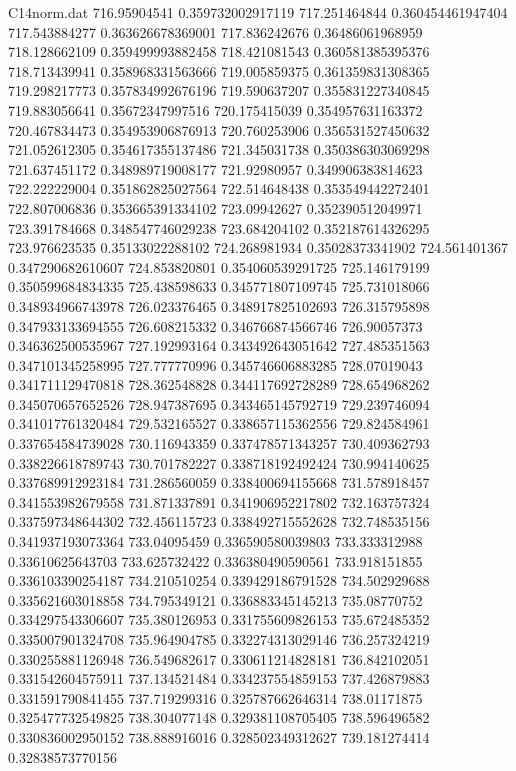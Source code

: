 \begin{filecontents}{C14norm.dat}
716.95904541			0.359732002917119
717.251464844			0.360454461947404
717.543884277			0.363626678369001
717.836242676			0.36486061968959
718.128662109			0.359499993882458
718.421081543			0.360581385395376
718.713439941			0.358968331563666
719.005859375			0.361359831308365
719.298217773			0.357834992676196
719.590637207			0.355831227340845
719.883056641			0.35672347997516
720.175415039			0.354957631163372
720.467834473			0.354953906876913
720.760253906			0.356531527450632
721.052612305			0.354617355137486
721.345031738			0.350386303069298
721.637451172			0.348989719008177
721.92980957			0.349906383814623
722.222229004			0.351862825027564
722.514648438			0.353549442272401
722.807006836			0.353665391334102
723.09942627			0.352390512049971
723.391784668			0.348547746029238
723.684204102			0.352187614326295
723.976623535			0.35133022288102
724.268981934			0.35028373341902
724.561401367			0.347290682610607
724.853820801			0.354060539291725
725.146179199			0.350599684834335
725.438598633			0.345771807109745
725.731018066			0.348934966743978
726.023376465			0.348917825102693
726.315795898			0.347933133694555
726.608215332			0.346766874566746
726.90057373			0.346362500535967
727.192993164			0.343492643051642
727.485351563			0.347101345258995
727.777770996			0.345746606883285
728.07019043			0.341711129470818
728.362548828			0.344117692728289
728.654968262			0.345070657652526
728.947387695			0.343465145792719
729.239746094			0.341017761320484
729.532165527			0.338657115362556
729.824584961			0.337654584739028
730.116943359			0.337478571343257
730.409362793			0.338226618789743
730.701782227			0.338718192492424
730.994140625			0.337689912923184
731.286560059			0.338400694155668
731.578918457			0.341553982679558
731.871337891			0.341906952217802
732.163757324			0.337597348644302
732.456115723			0.338492715552628
732.748535156			0.341937193073364
733.04095459			0.336590580039803
733.333312988			0.33610625643703
733.625732422			0.336380490590561
733.918151855			0.336103390254187
734.210510254			0.339429186791528
734.502929688			0.335621603018858
734.795349121			0.336883345145213
735.08770752			0.334297543306607
735.380126953			0.331755609826153
735.672485352			0.335007901324708
735.964904785			0.332274313029146
736.257324219			0.330255881126948
736.549682617			0.330611214828181
736.842102051			0.331542604575911
737.134521484			0.334237554859153
737.426879883			0.331591790841455
737.719299316			0.325787662646314
738.01171875			0.325477732549825
738.304077148			0.329381108705405
738.596496582			0.330836002950152
738.888916016			0.328502349312627
739.181274414			0.32838573770156

\end{filecontents}
